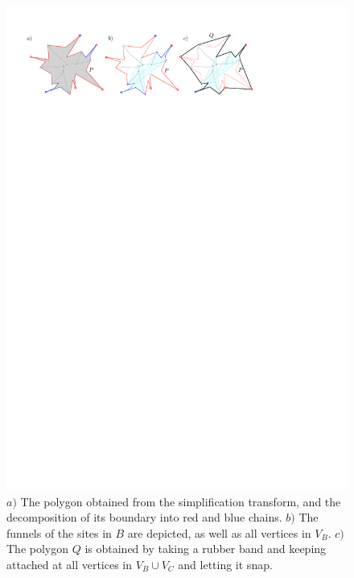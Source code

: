 \documentclass[a4paper,UKenglish]{socg-lipics-v2018}
\begin{document}
\begin{figure}[t]
\centering
\includegraphics{imgReduction.pdf}
\caption{$a)$ The polygon obtained from the simplification transform, and the decomposition of its boundary into red and blue chains.
$b)$ The funnels of the sites in $B$ are depicted, as well as all vertices in $V_B$.
$c)$ The polygon $Q$ is obtained by taking a rubber band and keeping attached at all vertices in $V_B\cup V_C$ and letting it snap. }
\label{fig:Reduction}
\end{figure}
\end{document}
